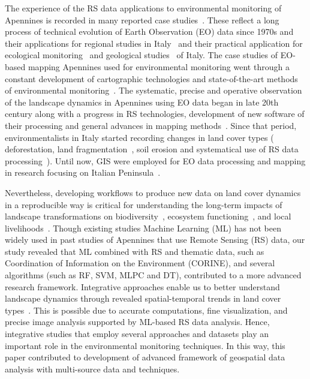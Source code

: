 \documentclass[jimaging,article,accept,pdftex,oneauthor]{Definitions/mdpi}
\begin{document}
{The experience of the RS data applications to environmental monitoring of Apennines is recorded in many reported case studies}~\cite{Leone01012001,Bonfiglio01012002,Salvati01062013}. {These reflect a long process of technical evolution of Earth Observation (EO) data since 1970s and their applications for regional studies in Italy}~\cite{Lanorte01012019,Spinetti18082019,DaRonco02062020} {and their practical application for ecological monitoring}~\cite{LEONE01041995,MariaBruschi01122012} {and geological studies}~\cite{Civile30112017,Panini09122020} {of Italy. The case studies of EO-based mapping Apennines used for environmental monitoring went through a constant development of cartographic technologies and state-of-the-art methods of environmental monitoring}~\cite{Petriccione01122005,Canullo01122005,Florenzano01012004,Segadelli30112017}. {The systematic, precise and operative observation of the landscape dynamics in Apennines using EO data began in late 20th century along with a progress in RS technologies, development of new software of their processing and general advances in mapping methods}~\cite{Savelli01032012,Mario31122023,Mariani13112018}. Since that period, environmentalists in Italy started recording changes in land cover types (%
deforestation, {land fragmentation}~\cite{Salvati02012017,Franchini03092022,Meriggi01012001}, {soil erosion and systematical use of RS data processing}~\cite{DAmico31122022}). {Until now, GIS were employed for EO data processing and mapping in research focusing on Italian Peninsula}~\cite{Marsico30112017,Spinetti18082019}.

{Nevertheless, }developing workflows to produce new data on land cover dynamics in a reproducible way is critical for understanding the long-term impacts of landscape transformations on biodiversity~\cite{land14040828,rs17071296,rs17071304}, ecosystem functioning~\cite{Jarnagin01092004}, and local livelihoods~\cite{Kuemmerle_2016,Buthelezi16022024}. {Though existing studies  Machine Learning (ML) has not been widely used in past studies of Apennines that use Remote Sensing (RS) data, our study revealed that ML combined with RS and thematic data, such as Coordination of Information on the Environment (CORINE), and several algorithms (such as RF, SVM, MLPC and DT), contributed to a more advanced research framework. Integrative approaches enable us to better understand landscape dynamics through revealed spatial-temporal trends in land cover types}~\cite{DellOvo02092023}. {This is possible due to accurate computations, fine visualization, and precise image analysis supported by ML-based RS data analysis. Hence, integrative studies that employ several approaches and datasets play an important role in the environmental monitoring techniques. In this way, this paper contributed to development of advanced framework of geospatial data analysis with multi-source data and techniques.}
\end{document}
